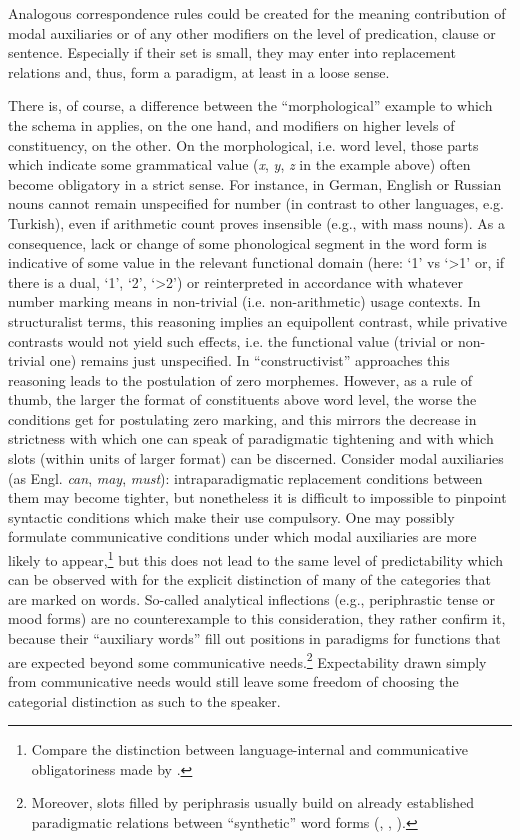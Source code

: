 \documentclass[output=paper]{langscibook}
\begin{document}
Analogous correspondence rules could be created for the meaning contribution of modal auxiliaries or of any other modifiers on the level of predication, clause or sentence. Especially if their set is small, they may enter into replacement relations and, thus, form a paradigm, at least in a loose sense.

There is, of course, a difference between the “morphological” example to which the schema in  applies, on the one hand, and modifiers on higher levels of constituency, on the other. On the morphological, i.e. word level, those parts which indicate some grammatical value (\textit{x}, \textit{y}, \textit{z} in the example above) often become obligatory in a strict sense. For instance, in German, English or Russian nouns cannot remain unspecified for number (in contrast to other languages, e.g. Turkish), even if arithmetic count proves insensible (e.g., with mass nouns). As a consequence, lack or change of some phonological segment in the word form is indicative of some value in the relevant functional domain (here: ‘1’ vs ‘>1’ or, if there is a dual, ‘1’, ‘2’, ‘>2’) or reinterpreted in accordance with whatever number marking means in non-trivial (i.e. non-arithmetic) usage contexts. In structuralist terms, this reasoning implies an equipollent contrast, while privative contrasts would not yield such effects, i.e. the functional value (trivial or non-trivial one) remains just unspecified. In ``constructivist'' approaches this reasoning leads to the postulation of zero morphemes. However, as a rule of thumb, the larger the format of constituents above word level, the worse the conditions get for postulating zero marking, and this mirrors the decrease in strictness with which one can speak of paradigmatic tightening and with which slots (within units of larger format) can be discerned. Consider modal auxiliaries (as Engl. \textit{can}, \textit{may}, \textit{must}): intraparadigmatic replacement conditions between them may become tighter, but nonetheless it is difficult to impossible to pinpoint syntactic conditions which make their use compulsory. One may possibly formulate communicative conditions under which modal auxiliaries are more likely to appear,\footnote{Compare the distinction between language-internal and communicative obligatoriness made by \citet[5]{DiewaldSmirnova2010}.} but this does not lead to the same level of predictability which can be observed with for the explicit distinction of many of the categories that are marked on words. So-called analytical inflections (e.g., periphrastic tense or mood forms) are no counterexample to this consideration, they rather confirm it, because their ``auxiliary words'' fill out positions in paradigms for functions that are expected beyond some communicative needs.\footnote{Moreover, slots filled by periphrasis usually build on already established paradigmatic relations between ``synthetic'' word forms (\citealt{Haspelmath2000}, \citealt[61--66]{Plungjan2011}, \citealt{SpencerPopova2015}).} Expectability drawn simply from communicative needs would still leave some freedom of choosing the categorial distinction as such to the speaker.
\end{document}
